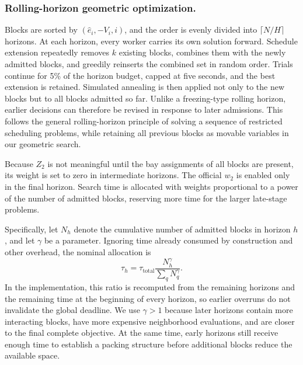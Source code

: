 \documentclass[runningheads]{llncs}
\begin{document}
\subsubsection{Rolling-horizon geometric optimization.}
Blocks are sorted by $(\hat e_i,-V_i,i)$, and the order is evenly divided into $\lceil N/H\rceil$ horizons. At each horizon, every worker carries its own solution forward. Schedule extension repeatedly removes $k$ existing blocks, combines them with the newly admitted blocks, and greedily reinserts the combined set in random order. Trials continue for 5\% of the horizon budget, capped at five seconds, and the best extension is retained. Simulated annealing is then applied not only to the new blocks but to all blocks admitted so far. Unlike a freezing-type rolling horizon, earlier decisions can therefore be revised in response to later admissions.
This follows the general rolling-horizon principle of solving a sequence of restricted scheduling problems\cite{ouyang2021}, while retaining all previous blocks as movable variables in our geometric search.

Because $Z_2$ is not meaningful until the bay assignments of all blocks are present, its weight is set to zero in intermediate horizons. The official $w_2$ is enabled only in the final horizon. Search time is allocated with weights proportional to a power of the number of admitted blocks, reserving more time for the larger late-stage problems.

Specifically, let $N_h$ denote the cumulative number of admitted blocks in
horizon $h$, and let $\gamma$ be a parameter.  Ignoring time already consumed
by construction and other overhead, the nominal allocation is
\begin{equation}
\tau_h=\tau_{\mathrm{total}}
\frac{N_h^{\gamma}}{\sum_q N_q^{\gamma}}.
\end{equation}
In the implementation, this ratio is recomputed from the remaining horizons
and the remaining time at the beginning of every horizon, so earlier
overruns do not invalidate the global deadline.  We use $\gamma>1$ because
later horizons contain more interacting blocks, have more expensive
neighborhood evaluations, and are closer to the final complete objective.
At the same time, early horizons still receive enough time to establish a
packing structure before additional blocks reduce the available space.
\end{document}

